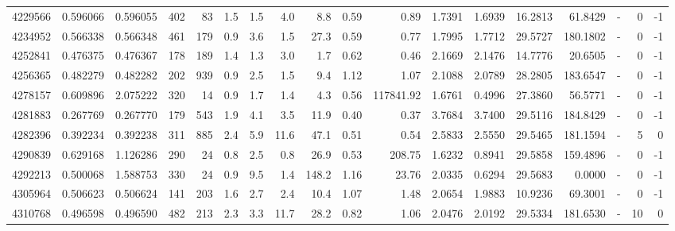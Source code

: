 \begin{tabular}{rrrrrrrrrrrrrrrlrr}
   4229566 & 0.596066 &   0.596055 &  402 &   83 &      1.5 &      1.5 &     4.0 &      8.8 &       0.59 &        0.89 &  1.7391 &  1.6939 &   16.2813 &   61.8429 &             - &        0 &         -1 \\
   4234952 & 0.566338 &   0.566348 &  461 &  179 &      0.9 &      3.6 &     1.5 &     27.3 &       0.59 &        0.77 &  1.7995 &  1.7712 &   29.5727 &  180.1802 &             - &        0 &         -1 \\
   4252841 & 0.476375 &   0.476367 &  178 &  189 &      1.4 &      1.3 &     3.0 &      1.7 &       0.62 &        0.46 &  2.1669 &  2.1476 &   14.7776 &   20.6505 &             - &        0 &         -1 \\
   4256365 & 0.482279 &   0.482282 &  202 &  939 &      0.9 &      2.5 &     1.5 &      9.4 &       1.12 &        1.07 &  2.1088 &  2.0789 &   28.2805 &  183.6547 &             - &        0 &         -1 \\
   4278157 & 0.609896 &   2.075222 &  320 &   14 &      0.9 &      1.7 &     1.4 &      4.3 &       0.56 &   117841.92 &  1.6761 &  0.4996 &   27.3860 &   56.5771 &             - &        0 &         -1 \\
   4281883 & 0.267769 &   0.267770 &  179 &  543 &      1.9 &      4.1 &     3.5 &     11.9 &       0.40 &        0.37 &  3.7684 &  3.7400 &   29.5116 &  184.8429 &             - &        0 &         -1 \\
   4282396 & 0.392234 &   0.392238 &  311 &  885 &      2.4 &      5.9 &    11.6 &     47.1 &       0.51 &        0.54 &  2.5833 &  2.5550 &   29.5465 &  181.1594 &             - &        5 &          0 \\
   4290839 & 0.629168 &   1.126286 &  290 &   24 &      0.8 &      2.5 &     0.8 &     26.9 &       0.53 &      208.75 &  1.6232 &  0.8941 &   29.5858 &  159.4896 &             - &        0 &         -1 \\
   4292213 & 0.500068 &   1.588753 &  330 &   24 &      0.9 &      9.5 &     1.4 &    148.2 &       1.16 &       23.76 &  2.0335 &  0.6294 &   29.5683 &    0.0000 &             - &        0 &         -1 \\
   4305964 & 0.506623 &   0.506624 &  141 &  203 &      1.6 &      2.7 &     2.4 &     10.4 &       1.07 &        1.48 &  2.0654 &  1.9883 &   10.9236 &   69.3001 &             - &        0 &         -1 \\
   4310768 & 0.496598 &   0.496590 &  482 &  213 &      2.3 &      3.3 &    11.7 &     28.2 &       0.82 &        1.06 &  2.0476 &  2.0192 &   29.5334 &  181.6530 &             - &       10 &          0 \\

\end{tabular}
